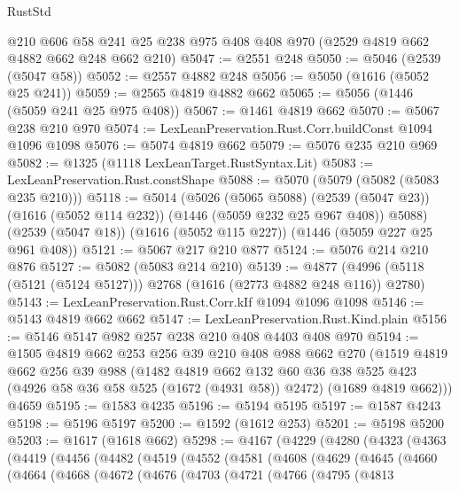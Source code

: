 \begin{lexlean}{RustStd}
\begin{coremodule}
{\begin{coremodule}
{{{{{{{{{{{    @210
    @606
    @58
    @241
    @25
    @238
    @975
    @408
    @408
    @970
    (@2529 @4819 @662 @4882 @662 @248 @662 @210)
@5047 := @2551 @248
@5050 := @5046 (@2539 (@5047 @58))
@5052 := @2557 @4882 @248
@5056 := @5050 (@1616 (@5052 @25 @241))
@5059 := @2565 @4819 @4882 @662
@5065 := @5056 (@1446 (@5059 @241 @25 @975 @408))
@5067 := @1461 @4819 @662
@5070 := @5067 @238 @210 @970
@5074 := LexLeanPreservation.Rust.Corr.buildConst @1094 @1096 @1098
@5076 := @5074 @4819 @662
@5079 := @5076 @235 @210 @969
@5082 := @1325 (@1118 LexLeanTarget.RustSyntax.Lit)
@5083 := LexLeanPreservation.Rust.constShape
@5088 := @5070 (@5079 (@5082 (@5083 @235 @210)))
@5118 := @5014
    (@5026
      (@5065 @5088)
      (@2539 (@5047 @23))
      (@1616 (@5052 @114 @232))
      (@1446 (@5059 @232 @25 @967 @408))
      @5088)
    (@2539 (@5047 @18))
    (@1616 (@5052 @115 @227))
    (@1446 (@5059 @227 @25 @961 @408))
@5121 := @5067 @217 @210 @877
@5124 := @5076 @214 @210 @876
@5127 := @5082 (@5083 @214 @210)
@5139 := @4877 (@4996 (@5118 (@5121 (@5124 @5127))) @2768 (@1616 (@2773 @4882 @248 @116)) @2780)
@5143 := LexLeanPreservation.Rust.Corr.kIf @1094 @1096 @1098
@5146 := @5143 @4819 @662 @662
@5147 := LexLeanPreservation.Rust.Kind.plain
@5156 := @5146 @5147 @982 @257 @238 @210 @408 @4403 @408 @970
@5194 := @1505
    @4819
    @662
    @253
    @256
    @39
    @210
    @408
    @988
    @662
    @270
    (@1519
      @4819
      @662
      @256
      @39
      @988
      (@1482
        @4819
        @662
        @132
        @60
        @36
        @38
        @525
        @423
        (@4926 @58 @36 @58 @525 (@1672 (@4931 @58)) @2472)
        (@1689 @4819 @662)))
    @4659
@5195 := @1583 @4235
@5196 := @5194 @5195
@5197 := @1587 @4243
@5198 := @5196 @5197
@5200 := @1592 (@1612 @253)
@5201 := @5198 @5200
@5203 := @1617 (@1618 @662)
@5298 := @4167
    (@4229
      (@4280
        (@4323
          (@4363
            (@4419
              (@4456
                (@4482
                  (@4519
                    (@4552
                      (@4581
                        (@4608
                          (@4629
                            (@4645
                              (@4660
                                (@4664
                                  (@4668
                                    (@4672
                                      (@4676
                                        (@4703
                                          (@4721
                                            (@4766
                                              (@4795
                                                (@4813
}}}}}}}}}}}
\end{coremodule}}
\end{coremodule}
\end{lexlean}
